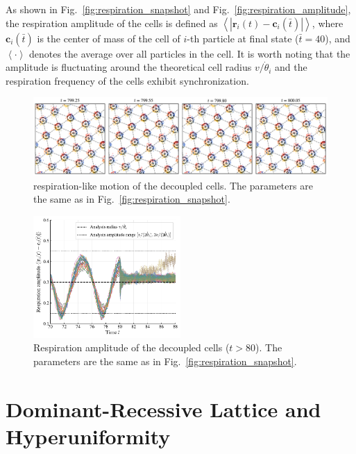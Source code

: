 \documentclass{article}
\begin{document}
As shown in Fig.~\ref{fig:respiration_snapshot} and Fig.~\ref{fig:respiration_amplitude}, the respiration amplitude of the cells is defined as $\left< \left| \mathbf{r}_i\left( t \right) -\mathbf{c}_i\left( \bar{t} \right) \right| \right> $, where $\mathbf{c}_i(\bar{t})$ is the center of mass of the cell of $i$-th particle at final state ($\bar{t}=40$), and $\left< \cdot \right>$ denotes the average over all particles in the cell. It is worth noting that the amplitude is fluctuating around the theoretical cell radius $v/\dot{\theta}_i$ and the
respiration frequency of the cells exhibit synchronization.

\begin{figure}[H]
    \centering
    \includegraphics[width=\textwidth]{./figs/respiration_snapshot_decoupled.pdf}
    \caption{
        respiration-like motion of the decoupled cells. The parameters are the same as in Fig.~\ref{fig:respiration_snapshot}.
    }
\end{figure}

\begin{figure}[H]
    \centering
    \includegraphics[width=0.5\textwidth]{./figs/respiration_amplitude_cells_decouled.pdf}
    \caption{
        Respiration amplitude of the decoupled cells ($t > 80$). The parameters are the same as in Fig.~\ref{fig:respiration_snapshot}.
    }
\end{figure}

\newpage
\section{\label{sec:hyperuniformity}Dominant-Recessive Lattice and Hyperuniformity}
\end{document}
